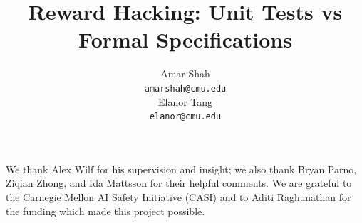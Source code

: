 \documentclass{article}
\title{Reward Hacking: Unit Tests vs Formal Specifications}
\author{%
  Amar Shah\\
  \texttt{amarshah@cmu.edu} \\
  \And
  Elanor Tang \\
  \texttt{elanor@cmu.edu} \\
}
\begin{document}
\maketitle














\begin{ack}
We thank Alex Wilf for his supervision and insight; we also thank 
Bryan Parno, Ziqian Zhong, and Ida Mattsson for their helpful comments.
We are grateful to the Carnegie Mellon AI Safety Initiative (CASI) 
and to Aditi Raghunathan for the funding which made this project possible.
\end{ack}






\appendix



\end{document}

